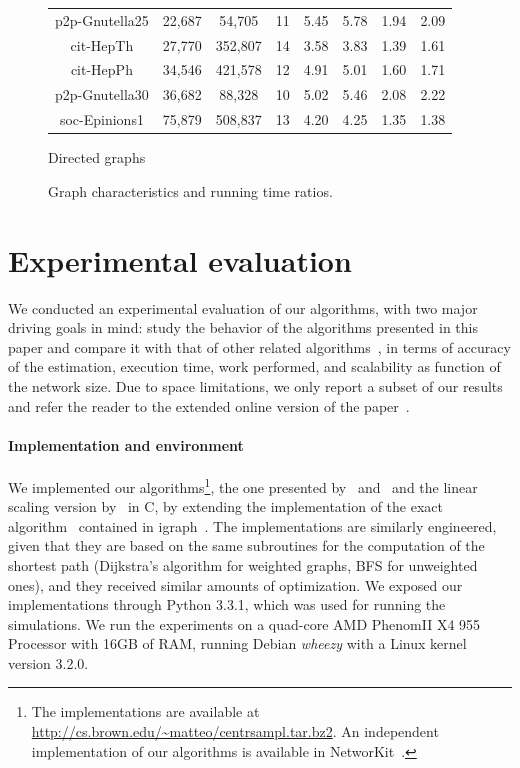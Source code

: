 \begin{figure}
\begin{subtable}{\textwidth}
\begin{small}
\begin{tabular}{cccccccc}
      p2p-Gnutella25 & 22,687 & 54,705 & 11 & 5.45 & 5.78 & 1.94 & 2.09 \\
      cit-HepTh & 27,770 & 352,807 & 14 & 3.58 & 3.83 & 1.39 & 1.61 \\
      cit-HepPh & 34,546 & 421,578 & 12 & 4.91 & 5.01 & 1.60 & 1.71 \\ 
      p2p-Gnutella30 & 36,682 & 88,328 & 10 & 5.02 & 5.46 & 2.08 & 2.22\\
      soc-Epinions1 & 75,879 & 508,837 & 13 & 4.20 & 4.25 & 1.35 & 1.38\\
      \bottomrule
    \end{tabular} 
  \end{small}
  \ifdmkd
  \else
  \caption{Directed graphs}
  \label{tab:expDir}
  \fi
  \end{subtable}
  \caption{Graph characteristics and running time ratios.}
  \label{fig:tables}
\end{figure}

\section{Experimental evaluation}\label{sec:exper}
We conducted an experimental evaluation of our algorithms, with two major
driving goals in mind: study the behavior of the algorithms presented in this
paper and compare it with that of other related
algorithms~\citep{Brandes01,BrandesP07,JacobKLPT05,GeisbergerSS08}, in terms of
accuracy of the estimation, execution time, work performed, and scalability as
function of the network size.
\ifproof 
\else
Due to space limitations, we only report a subset
of our results and refer the reader to the extended online version of the
paper~\citep{RiondatoK13}.
\fi

\paragraph{Implementation and environment}
We implemented our algorithms\footnote{The implementations are available at
\url{http://cs.brown.edu/~matteo/centrsampl.tar.bz2}. An independent
implementation of our algorithms is available in NetworKit~\citep{StaudtSM14}.},
the one presented by~\citet{BrandesP07} and~\citet{JacobKLPT05} and the linear scaling
version by~\citet{GeisbergerSS08} in C, by extending the implementation of the
exact algorithm~\citep{Brandes01} contained in igraph~\citep{igraph}.
The implementations are similarly engineered, given that they are based on the
same subroutines for the computation of the shortest path (Dijkstra's algorithm
for weighted graphs, BFS for unweighted ones), and they received similar amounts
of optimization. We exposed our implementations through Python 3.3.1, which was
used for running the simulations. We run the experiments on a quad-core AMD
Phenom\texttrademark II X4 955 Processor with 16GB of RAM, running Debian
\emph{wheezy} with a Linux kernel version 3.2.0.

